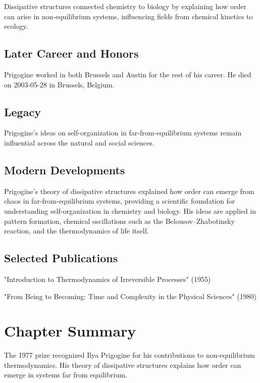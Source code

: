 Dissipative structures connected chemistry to biology by explaining how order can arise in non-equilibrium systems, influencing fields from chemical kinetics to ecology.

\subsection*{Later Career and Honors}

Prigogine worked in both Brussels and Austin for the rest of his career. He died on 2003-05-28 in Brussels, Belgium.

\subsection*{Legacy}

Prigogine's ideas on self-organization in far-from-equilibrium systems remain influential across the natural and social sciences.

\subsection*{Modern Developments}

Prigogine's theory of dissipative structures explained how order can emerge from chaos in far-from-equilibrium systems, providing a scientific foundation for understanding self-organization in chemistry and biology. His ideas are applied in pattern formation, chemical oscillations such as the Belousov–Zhabotinsky reaction, and the thermodynamics of life itself.

\subsection*{Selected Publications}

"Introduction to Thermodynamics of Irreversible Processes" (1955)

"From Being to Becoming: Time and Complexity in the Physical Sciences" (1980)

\clearpage

\section*{Chapter Summary}

The 1977 prize recognized Ilya Prigogine for his contributions to non-equilibrium thermodynamics. His theory of dissipative structures explains how order can emerge in systems far from equilibrium.

